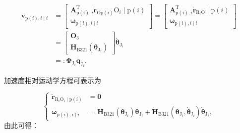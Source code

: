 \[
\begin{aligned}
\boldsymbol{v}_{\mathrm{p}(i), i \mid i} & =\left[\begin{array}{c}
\boldsymbol{A}_{\mathrm{p}(i), i}^{\mathrm{T}} \dot{\boldsymbol{r}}_{\mathrm{O} \mathrm{p}(i)} \mathrm{O}_{i} \mid \mathrm{p}(i) \\
\boldsymbol{\omega}_{\mathrm{p}(i), i \mid i}
\end{array}\right]=\left[\begin{array}{c}
\boldsymbol{A}_{\mathrm{p}(i), i}^{\mathrm{T}} \dot{\boldsymbol{r}}_{\mathrm{R}_{i} \mathrm{O}} \mid \mathrm{p}(i) \\
\boldsymbol{\omega}_{\mathrm{p}(i), i \mid i}
\end{array}\right] \\
& =\left[\begin{array}{c}
\boldsymbol{O}_{3} \\
\boldsymbol{H}_{\mathrm{B} 321}\left(\boldsymbol{\theta}_{\mathrm{J}_{i}}\right)
\end{array}\right] \dot{\boldsymbol{\theta}}_{\mathrm{J}_{i}} \\
& =: \boldsymbol{\Phi}_{\mathrm{J}_{i}} \dot{\boldsymbol{q}}_{\mathrm{J}_{i}} .
\end{aligned}
\]

加速度相对运动学方程可表示为

\[
\left\{\begin{aligned}
\ddot{\boldsymbol{r}}_{\mathrm{R}_{i} \mathrm{O}_{i}\mid \mathrm{p}(i)}  & =\mathbf{0} \\
\dot{\boldsymbol{\omega}}_{\mathrm{p}(i), i \mid i} & =\boldsymbol{H}_{\mathrm{B} 321}\left(\boldsymbol{\theta}_{\mathrm{J}_{i}}\right) \ddot{\boldsymbol{\theta}}_{\mathrm{J}_{i}}+\dot{\boldsymbol{H}}_{\mathrm{B} 321}\left(\boldsymbol{\theta}_{\mathrm{J}_{i}}, \dot{\boldsymbol{\theta}}_{\mathrm{J}_{i}}\right) \dot{\boldsymbol{\theta}}_{\mathrm{J}_{i}},
\end{aligned}\right.
\]
由此可得：

